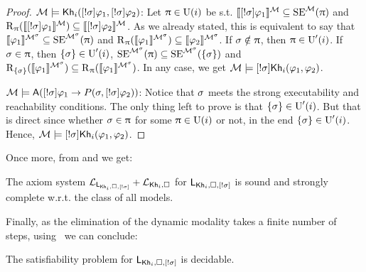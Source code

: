 \begin{proof}
  $\modults \models \khi(\srefbox{\plan} \varphi_1,\srefbox{\plan} \varphi_2)$: Let $\plans \in \Unc(i)$ be s.t. $\truthset{\modults}{\srefbox{\plan}\varphi_1} \subseteq \stexec^\modults(\plans)$ and $\R_\plans(\truthset{\modults}{\srefbox{\plan}\varphi_1}) \subseteq \truthset{\modults}{\srefbox{\plan}\varphi_2}$.
As we already stated, this is equivalent to say that $\truthset{\modults^\plan}{\varphi_1} \subseteq \stexec^{\modults^\plan}(\plans)$ and $\R_\plans(\truthset{\modults^\plan}{\varphi_1}) \subseteq \truthset{\modults^\plan}{\varphi_2}$.
If $\plan \notin \plans$, then $\plans \in \Unc'(i)$.
If $\plan \in \plans$, then $\set{\plan} \in \Unc'(i)$, $\stexec^{\modults^\plan}(\plans) \subseteq \stexec^{\modults^\plan}(\set{\plan})$ and $\R_{\set{\plan}}(\truthset{\modults^\plan}{\varphi_1}) \subseteq \R_\plans(\truthset{\modults^\plan}{\varphi_1})$. In any case, we get $\modults \models \srefbox{\plan}\khi(\varphi_1,\varphi_2)$.

$\modults \models \A(\srefbox{\plan} \varphi_1 \ra P(\plan,\srefbox{\plan}\varphi_2))$: Notice that $\plan$ meets the strong executability and reachability conditions.
The only thing left to prove is that $\set{\plan} \in \Unc'(i)$. But that is direct since whether $\plan \in \plans$ for some $\plans \in \Unc(i)$ or not, in the end $\set{\plan} \in \Unc'(i)$. Hence, $\modults \models \srefbox{\plan}\khi(\varphi_1,\varphi_2)$.
\end{proof}

Once more, from  and  we get:

\medskip 

\begin{theorem}
The axiom system $\axset_{\PlanReflogic}+\axset_{\khi,\square}$ for $\PlanReflogic$ is sound and strongly complete w.r.t. the class of all models.
\end{theorem}

\medskip 


Finally, as the elimination of the dynamic modality takes a finite number of steps, using~ we can conclude:

\medskip 

\begin{corollary}
The satisfiability problem for $\PlanReflogic$ is decidable.
\end{corollary} 

\medskip 

